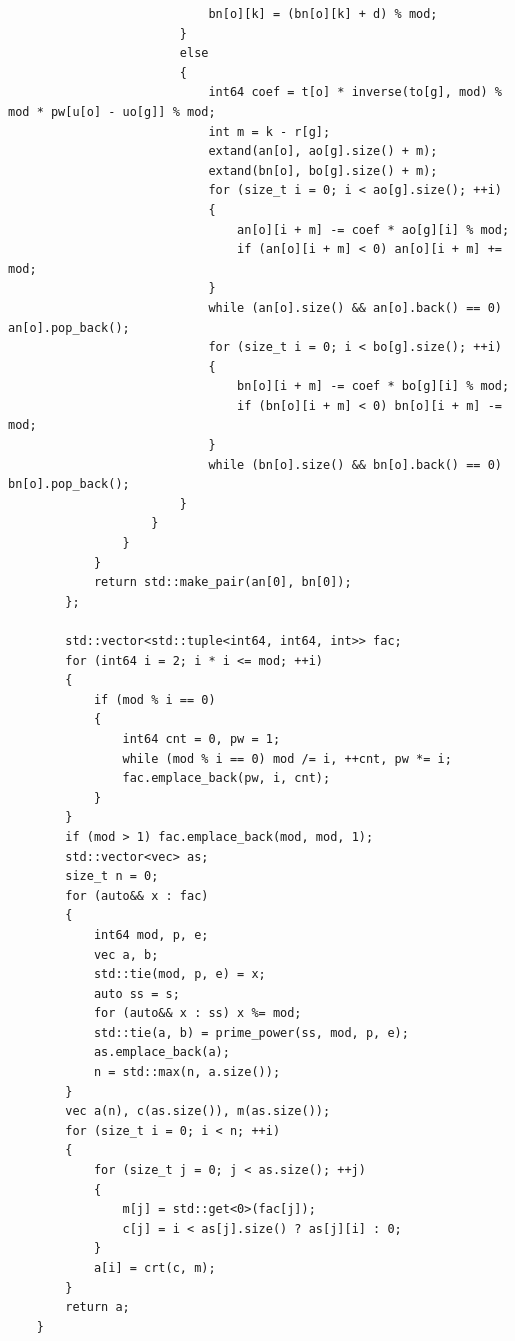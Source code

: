 \documentclass[twoside]{article}
\begin{document}
\begin{lstlisting}
                            bn[o][k] = (bn[o][k] + d) % mod;
                        }
                        else
                        {
                            int64 coef = t[o] * inverse(to[g], mod) % mod * pw[u[o] - uo[g]] % mod;
                            int m = k - r[g];
                            extand(an[o], ao[g].size() + m);
                            extand(bn[o], bo[g].size() + m);
                            for (size_t i = 0; i < ao[g].size(); ++i)
                            {
                                an[o][i + m] -= coef * ao[g][i] % mod;
                                if (an[o][i + m] < 0) an[o][i + m] += mod;
                            }
                            while (an[o].size() && an[o].back() == 0) an[o].pop_back();
                            for (size_t i = 0; i < bo[g].size(); ++i)
                            {
                                bn[o][i + m] -= coef * bo[g][i] % mod;
                                if (bn[o][i + m] < 0) bn[o][i + m] -= mod;
                            }
                            while (bn[o].size() && bn[o].back() == 0) bn[o].pop_back();
                        }
                    }
                }
            }
            return std::make_pair(an[0], bn[0]);
        };

        std::vector<std::tuple<int64, int64, int>> fac;
        for (int64 i = 2; i * i <= mod; ++i)
        {
            if (mod % i == 0)
            {
                int64 cnt = 0, pw = 1;
                while (mod % i == 0) mod /= i, ++cnt, pw *= i;
                fac.emplace_back(pw, i, cnt);
            }
        }
        if (mod > 1) fac.emplace_back(mod, mod, 1);
        std::vector<vec> as;
        size_t n = 0;
        for (auto&& x : fac)
        {
            int64 mod, p, e;
            vec a, b;
            std::tie(mod, p, e) = x;
            auto ss = s;
            for (auto&& x : ss) x %= mod;
            std::tie(a, b) = prime_power(ss, mod, p, e);
            as.emplace_back(a);
            n = std::max(n, a.size());
        }
        vec a(n), c(as.size()), m(as.size());
        for (size_t i = 0; i < n; ++i)
        {
            for (size_t j = 0; j < as.size(); ++j)
            {
                m[j] = std::get<0>(fac[j]);
                c[j] = i < as[j].size() ? as[j][i] : 0;
            }
            a[i] = crt(c, m);
        }
        return a;
    }


\end{lstlisting}
\end{document}
